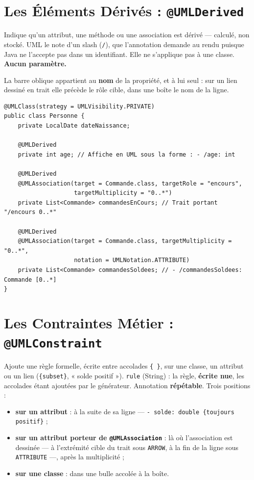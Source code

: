 \documentclass[12pt, a4paper]{article}
\begin{document}
\section{Les Éléments Dérivés : \texttt{@UMLDerived}}

Indique qu'un attribut, une méthode ou une association est dérivé --- calculé, non stocké. UML le note d'un slash (\texttt{/}), que l'annotation demande au rendu puisque Java ne l'accepte pas dans un identifiant. Elle ne s'applique pas à une classe. \textbf{Aucun paramètre.}

La barre oblique appartient au \textbf{nom} de la propriété, et à lui seul : sur un lien dessiné en trait elle précède le rôle cible, dans une boîte le nom de la ligne.

\begin{lstlisting}
@UMLClass(strategy = UMLVisibility.PRIVATE)
public class Personne {
    private LocalDate dateNaissance;

    @UMLDerived
    private int age; // Affiche en UML sous la forme : - /age: int

    @UMLDerived
    @UMLAssociation(target = Commande.class, targetRole = "encours",
                    targetMultiplicity = "0..*")
    private List<Commande> commandesEnCours; // Trait portant "/encours 0..*"

    @UMLDerived
    @UMLAssociation(target = Commande.class, targetMultiplicity = "0..*",
                    notation = UMLNotation.ATTRIBUTE)
    private List<Commande> commandesSoldees; // - /commandesSoldees: Commande [0..*]
}
\end{lstlisting}

\section{Les Contraintes Métier : \texttt{@UMLConstraint}}
\label{sec:contrainte-position}

Ajoute une règle formelle, écrite entre accolades \texttt{\{ \}}, sur une classe, un attribut ou un lien (\texttt{\{subset\}}, « solde positif »). \texttt{rule} (String) : la règle, \textbf{écrite nue}, les accolades étant ajoutées par le générateur. Annotation \textbf{répétable}. Trois positions :
\begin{itemize}
    \item \textbf{sur un attribut} : à la suite de sa ligne --- \texttt{- solde: double \{toujours positif\}} ;
    \item \textbf{sur un attribut porteur de \texttt{@UMLAssociation}} : là où l'association est dessinée --- à l'extrémité cible du trait sous \texttt{ARROW}, à la fin de la ligne sous \texttt{ATTRIBUTE} ---, après la multiplicité ;
    \item \textbf{sur une classe} : dans une bulle accolée à la boîte.
\end{itemize}
\end{document}
